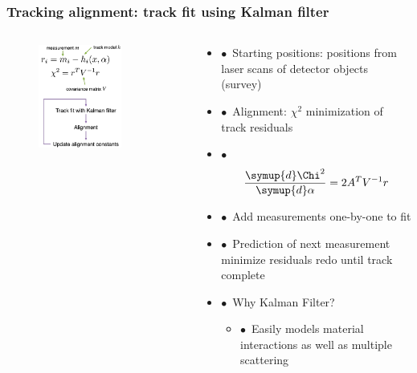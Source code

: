 \documentclass[aspectratio=1610, 12pt, xcolor=dvipsnames]{beamer}
\begin{document}
\begin{frame}\frametitle{Tracking alignment: track fit using Kalman filter}
  \begin{columns}
    \begin{column}[c]{0.4\textwidth}
      \begin{figure}
        \centering
        \includegraphics[width=0.72\textwidth]{logos/kalman.png}
      \end{figure}
    \end{column}
    \begin{column}[c]{0.55\textwidth}
      \begin{itemize}
        \item $\bullet$\, Starting positions: positions from laser scans of detector objects (survey)
        \item $\bullet$\, Alignment: $\chi^2$ minimization of track residuals
        \item $\bullet$\,\begin{equation}
          \frac{\symup{d}\Chi^2}{\symup{d}\alpha} = 2 A^T V^{-1}r
      \end{equation}
        \item $\bullet$\, Add measurements one-by-one to fit
        \item $\bullet$\, Prediction of next measurement \to minimize residuals \to redo until track complete
        \item $\bullet$\, Why Kalman Filter?
        \begin{itemize}
          \item $\bullet$\, Easily models material interactions as well as multiple scattering
        \end{itemize}
      \end{itemize}
    \end{column}
  \end{columns}
\end{frame}
\end{document}
